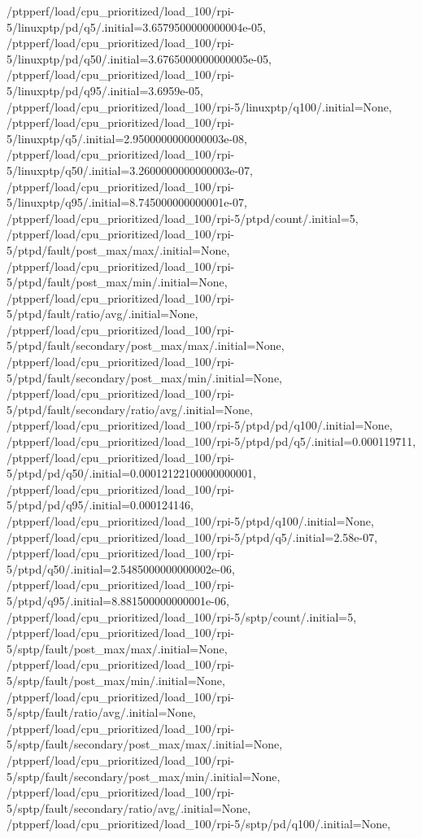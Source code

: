 {    /ptpperf/load/cpu_prioritized/load_100/rpi-5/linuxptp/pd/q5/.initial=3.6579500000000004e-05,
    /ptpperf/load/cpu_prioritized/load_100/rpi-5/linuxptp/pd/q50/.initial=3.6765000000000005e-05,
    /ptpperf/load/cpu_prioritized/load_100/rpi-5/linuxptp/pd/q95/.initial=3.6959e-05,
    /ptpperf/load/cpu_prioritized/load_100/rpi-5/linuxptp/q100/.initial=None,
    /ptpperf/load/cpu_prioritized/load_100/rpi-5/linuxptp/q5/.initial=2.9500000000000003e-08,
    /ptpperf/load/cpu_prioritized/load_100/rpi-5/linuxptp/q50/.initial=3.2600000000000003e-07,
    /ptpperf/load/cpu_prioritized/load_100/rpi-5/linuxptp/q95/.initial=8.745000000000001e-07,
    /ptpperf/load/cpu_prioritized/load_100/rpi-5/ptpd/count/.initial=5,
    /ptpperf/load/cpu_prioritized/load_100/rpi-5/ptpd/fault/post_max/max/.initial=None,
    /ptpperf/load/cpu_prioritized/load_100/rpi-5/ptpd/fault/post_max/min/.initial=None,
    /ptpperf/load/cpu_prioritized/load_100/rpi-5/ptpd/fault/ratio/avg/.initial=None,
    /ptpperf/load/cpu_prioritized/load_100/rpi-5/ptpd/fault/secondary/post_max/max/.initial=None,
    /ptpperf/load/cpu_prioritized/load_100/rpi-5/ptpd/fault/secondary/post_max/min/.initial=None,
    /ptpperf/load/cpu_prioritized/load_100/rpi-5/ptpd/fault/secondary/ratio/avg/.initial=None,
    /ptpperf/load/cpu_prioritized/load_100/rpi-5/ptpd/pd/q100/.initial=None,
    /ptpperf/load/cpu_prioritized/load_100/rpi-5/ptpd/pd/q5/.initial=0.000119711,
    /ptpperf/load/cpu_prioritized/load_100/rpi-5/ptpd/pd/q50/.initial=0.00012122100000000001,
    /ptpperf/load/cpu_prioritized/load_100/rpi-5/ptpd/pd/q95/.initial=0.000124146,
    /ptpperf/load/cpu_prioritized/load_100/rpi-5/ptpd/q100/.initial=None,
    /ptpperf/load/cpu_prioritized/load_100/rpi-5/ptpd/q5/.initial=2.58e-07,
    /ptpperf/load/cpu_prioritized/load_100/rpi-5/ptpd/q50/.initial=2.5485000000000002e-06,
    /ptpperf/load/cpu_prioritized/load_100/rpi-5/ptpd/q95/.initial=8.881500000000001e-06,
    /ptpperf/load/cpu_prioritized/load_100/rpi-5/sptp/count/.initial=5,
    /ptpperf/load/cpu_prioritized/load_100/rpi-5/sptp/fault/post_max/max/.initial=None,
    /ptpperf/load/cpu_prioritized/load_100/rpi-5/sptp/fault/post_max/min/.initial=None,
    /ptpperf/load/cpu_prioritized/load_100/rpi-5/sptp/fault/ratio/avg/.initial=None,
    /ptpperf/load/cpu_prioritized/load_100/rpi-5/sptp/fault/secondary/post_max/max/.initial=None,
    /ptpperf/load/cpu_prioritized/load_100/rpi-5/sptp/fault/secondary/post_max/min/.initial=None,
    /ptpperf/load/cpu_prioritized/load_100/rpi-5/sptp/fault/secondary/ratio/avg/.initial=None,
    /ptpperf/load/cpu_prioritized/load_100/rpi-5/sptp/pd/q100/.initial=None,
}

